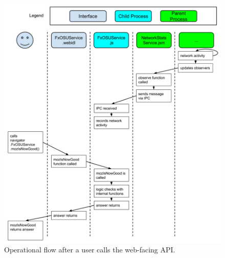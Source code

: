\documentclass[12pt]{article}
\begin{document}
\begin{figure}[h!]
  \centering
    \includegraphics[scale=0.35]{userflow.png}
  \caption{Operational flow after a user calls the web-facing API.}
\end{figure}
\pagebreak
\end{document}
